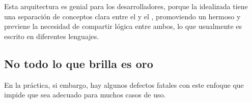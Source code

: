 Esta arquitectura es genial para los desarrolladores, porque la idealizada \singlePageAppINT tiene una separación de conceptos clara entre el \clientAS y el \serverAS, promoviendo un hermoso \workflowCPT y previene la necesidad de compartir lógica entre ambos, lo que usualmente es escrito en diferentes lenguajes.

\subsection{No todo lo que brilla es oro}

En la práctica, si embargo, hay algunos defectos fatales con este enfoque que impide que sea adecuado para muchos casos de uso.


